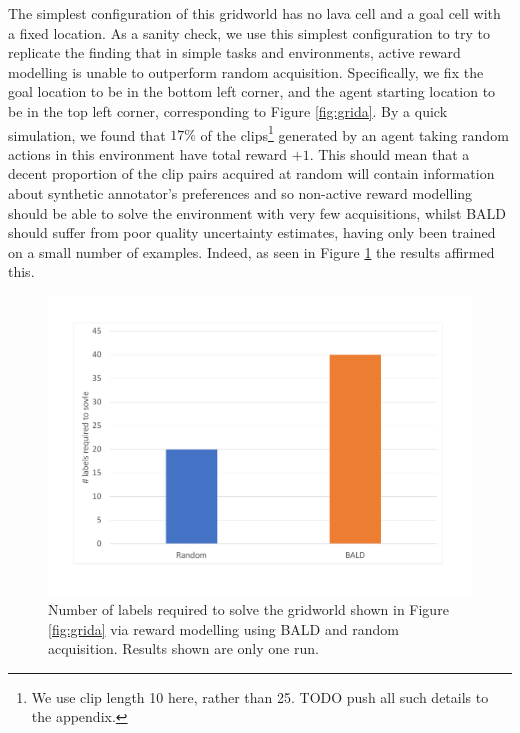 \documentclass[11pt, a4paper, bibliography=totoc]{report}
\begin{document}
The simplest configuration of this gridworld has no lava cell and a goal cell with a fixed location. As a sanity check, we use this simplest configuration to try to replicate the finding that in simple tasks and environments, active reward modelling is unable to outperform random acquisition. Specifically, we fix the goal location to be in the bottom left corner, and the agent starting location to be in the top left corner, corresponding to Figure \ref{fig:grida}. By a quick simulation, we found that $ 17\% $ of the clips\footnote{We use clip length 10 here, rather than 25. TODO push all such details to the appendix.} generated by an agent taking random actions in this environment have total reward $ +1 $. This should mean that a decent proportion of the clip pairs acquired at random will contain information about synthetic annotator's preferences and so non-active reward modelling should be able to solve the environment with very few acquisitions, whilst BALD should suffer from poor quality uncertainty estimates, having only been trained on a small number of examples. Indeed, as seen in Figure \ref{fig:grid_simple} the results affirmed this.

\begin{figure}[h]
	\centering
	\includegraphics[width=\textwidth]{grid_simple}
	\caption{Number of labels required to solve the gridworld shown in Figure \ref{fig:grida} via reward modelling using BALD and random acquisition. Results shown are only one run.}
	\label{fig:grid_simple}
\end{figure}
\end{document}
